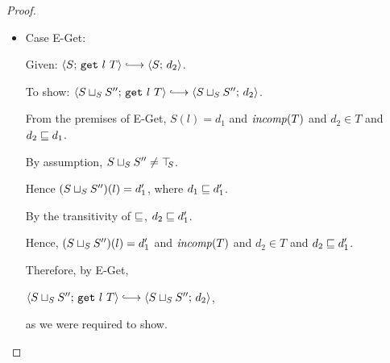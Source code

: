 \begin{proof}
\begin{itemize}
    \item Case {\sc E-Get}:

      Given: $\config{S}{\getexp{l}{T}} \parstepsto \config{S}{d_2}$.

      To show: $\config{\lubstore{S}{S''}}{\getexp{l}{T}} \parstepsto
      \config{\lubstore{S}{S''}}{d_2}$.

      From the premises of {\sc E-Get}, $S(l) = d_1$ and $\mathit{incomp}(T)$
      and $d_2 \in T$ and $d_2 \sqsubseteq d_1$.

      By assumption, $S \sqcup_{S} S'' \neq \top\hspace{-0.85mm}_{S}$.

      Hence $(S \sqcup_{S} S'')(l) = d'_1$, where $d_1 \sqsubseteq d'_1$.

      By the transitivity of $\sqsubseteq$, $d_2 \sqsubseteq d'_1$.

      Hence, $(S \sqcup_{S} S'')(l) = d'_1$ and $\mathit{incomp}(T)$ and $d_2
      \in T$ and $d_2 \sqsubseteq d'_1$.

      Therefore, by {\sc E-Get},

      $\config{\lubstore{S}{S''}}{\getexp{l}{T}} \parstepsto
      \config{\lubstore{S}{S''}}{d_2}$,

      as we were required to show.
  \end{itemize}
\end{proof}
